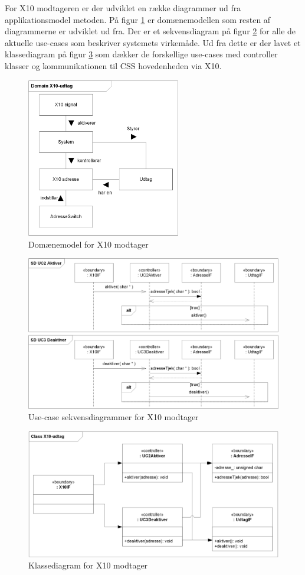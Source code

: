 For X10 modtageren er der udviklet en række diagrammer ud fra applikationsmodel metoden.
På figur \ref{fig:X10_modtager_domain} er domænemodellen som resten af diagrammerne er udviklet ud fra.
Der er et sekvensdiagram på figur \ref{fig:X10_modtager_SD} for alle de aktuelle use-cases som beskriver systemets virkemåde.
Ud fra dette er der lavet et klassediagram på figur \ref{fig:X10_modtager_Class} som dækker de forskellige use-cases med controller klasser og kommunikationen til CSS hovedenheden via X10.


\begin{figure}[!htb] \centering
\centering \includegraphics[width=0.6\textwidth]{billeder/uml/X10_modtager_Domain}
     \caption{Domænemodel for X10 modtager}
     \label{fig:X10_modtager_domain}
\end{figure}

\begin{figure}[!htb]
	\includegraphics[width=\textwidth]{billeder/uml/X10_modtager_SD}
     \caption{Use-case sekvensdiagrammer for X10 modtager}
     \label{fig:X10_modtager_SD}
\end{figure}

\begin{figure}[!htb]
     \includegraphics[width=\textwidth]{billeder/uml/X10_modtager_Class}
     \caption{Klassediagram for X10 modtager}
     \label{fig:X10_modtager_Class}
\end{figure}
